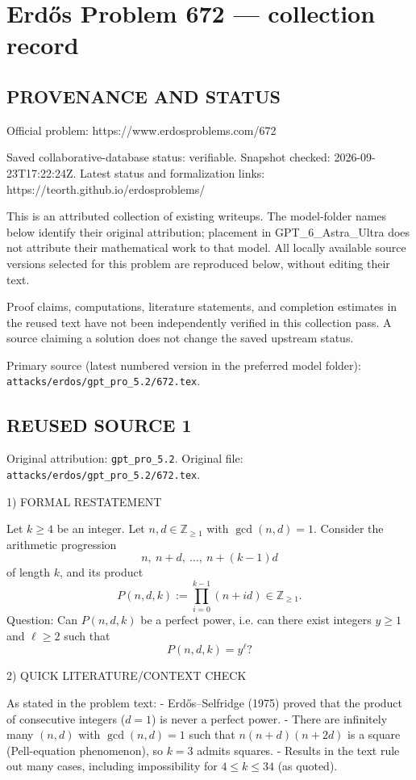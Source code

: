 \section*{Erd\H{o}s Problem 672 --- collection record}

\subsection*{PROVENANCE AND STATUS}
Official problem: https://www.erdosproblems.com/672

Saved collaborative-database status: verifiable.
Snapshot checked: 2026-09-23T17:22:24Z.
Latest status and formalization links: https://teorth.github.io/erdosproblems/

This is an attributed collection of existing writeups. The model-folder names below identify their original attribution; placement in GPT\_6\_Astra\_Ultra does not attribute their mathematical work to that model. All locally available source versions selected for this problem are reproduced below, without editing their text.

Proof claims, computations, literature statements, and completion estimates in the reused text have not been independently verified in this collection pass. A source claiming a solution does not change the saved upstream status.

Primary source (latest numbered version in the preferred model folder): \texttt{attacks/erdos/gpt\_pro\_5.2/672.tex}.

\subsection*{REUSED SOURCE 1}
Original attribution: \texttt{gpt\_pro\_5.2}.
Original file: \texttt{attacks/erdos/gpt\_pro\_5.2/672.tex}.


1) FORMAL RESTATEMENT

Let $k\ge 4$ be an integer. Let $n,d\in\mathbb Z_{\ge 1}$ with $\gcd(n,d)=1$. Consider the arithmetic progression
\[
 n,\ n+d,\ \dots,\ n+(k-1)d
\]
of length $k$, and its product
\[
 P(n,d,k):=\prod_{i=0}^{k-1}(n+id)\in\mathbb Z_{\ge 1}.
\]
Question: Can $P(n,d,k)$ be a perfect power, i.e. can there exist integers $y\ge 1$ and $\ell\ge 2$ such that
\[
 P(n,d,k)=y^{\ell}?
\]

2) QUICK LITERATURE/CONTEXT CHECK

As stated in the problem text:
- Erd\H{o}s--Selfridge (1975) proved that the product of consecutive integers ($d=1$) is never a perfect power.
- There are infinitely many $(n,d)$ with $\gcd(n,d)=1$ such that $n(n+d)(n+2d)$ is a square (Pell-equation phenomenon), so $k=3$ admits squares.
- Results in the text rule out many cases, including impossibility for $4\le k\le 34$ (as quoted).


